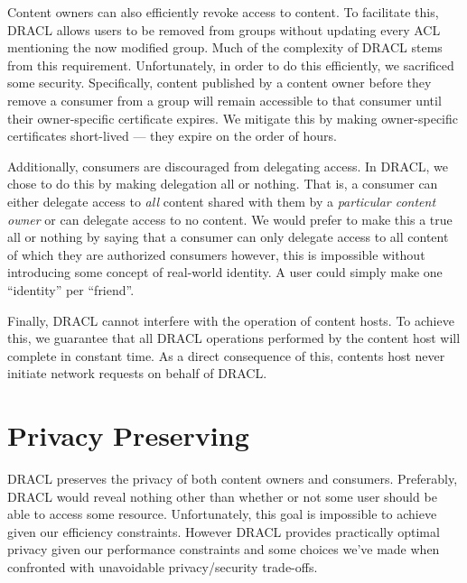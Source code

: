 \documentclass[pdftex,12pt,a4papaer]{report}
\begin{document}
\begin{compactenum}
Content owners can also efficiently revoke access to content. To facilitate
this, DRACL allows users to be removed from groups without updating every ACL
mentioning the now modified group. Much of the complexity of DRACL stems from
this requirement. Unfortunately, in order to do this efficiently, we sacrificed
some security. Specifically, content published by a content owner before they
remove a consumer from a group will remain accessible to that consumer until
their owner-specific certificate expires. We mitigate this by making
owner-specific certificates short-lived --- they expire on the order of hours.

Additionally, consumers are discouraged from delegating access. In DRACL, we
chose to do this by making delegation all or nothing. That is, a consumer can
either delegate access to \emph{all} content shared with them by a
\emph{particular content owner} or can delegate access to no content. We would
prefer to make this a true all or nothing by saying that a consumer can only
delegate access to all content of which they are authorized consumers however,
this is impossible without introducing some concept of real-world identity. A
user could simply make one ``identity'' per ``friend''. 

Finally, DRACL cannot interfere with the operation of content hosts. To achieve
this, we guarantee that all DRACL operations performed by the content host will
complete in constant time. As a direct consequence of this, contents host never
initiate network requests on behalf of DRACL\@.

\section{Privacy Preserving}

DRACL preserves the privacy of both content owners and consumers. Preferably,
DRACL would reveal nothing other than whether or not some user should be able to
access some resource. Unfortunately, this goal is impossible to achieve given
our efficiency constraints. However DRACL provides practically optimal privacy
given our performance constraints and some choices we've made when confronted
with unavoidable privacy/security trade-offs.


\end{compactenum}
\end{document}
